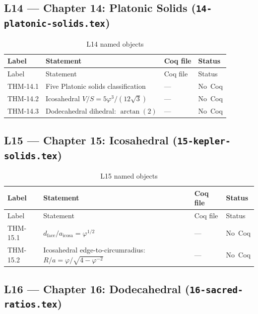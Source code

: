 \subsection{L14 — Chapter 14: Platonic Solids
  (\texttt{14-platonic-solids.tex})}
\label{sec:A-L14}

\begin{longtable}{lp{6cm}ll}
\toprule
Label & Statement & Coq file & Status \\
\midrule
\endfirsthead
\toprule
Label & Statement & Coq file & Status \\
\midrule
\endhead
\bottomrule
\endfoot
\bottomrule
\caption{L14 named objects}
\endlastfoot
THM-14.1 & Five Platonic solids classification & --- & No~Coq \\
THM-14.2 & Icosahedral $V/S = 5\varphi^{3}/(12\sqrt{3})$ & --- & No~Coq \\
THM-14.3 & Dodecahedral dihedral: $\arctan(2)$ & --- & No~Coq \\
\end{longtable}

\subsection{L15 — Chapter 15: Icosahedral (\texttt{15-kepler-solids.tex})}
\label{sec:A-L15}

\begin{longtable}{lp{6cm}ll}
\toprule
Label & Statement & Coq file & Status \\
\midrule
\endfirsthead
\toprule
Label & Statement & Coq file & Status \\
\midrule
\endhead
\bottomrule
\endfoot
\bottomrule
\caption{L15 named objects}
\endlastfoot
THM-15.1 & $d_{\text{face}}/a_{\text{icosa}} = \varphi^{1/2}$ & --- & No~Coq \\
THM-15.2 &
  Icosahedral edge-to-circumradius:
  $R/a = \varphi/\sqrt{4-\varphi^{-2}}$ & --- & No~Coq \\
\end{longtable}

\subsection{L16 — Chapter 16: Dodecahedral (\texttt{16-sacred-ratios.tex})}
\label{sec:A-L16}

